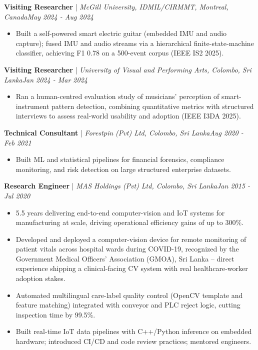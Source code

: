 \documentclass[11pt]{article}
\newenvironment{cvrole}[5]{%
  \par\noindent\textbf{\large #1} | \textit{\small #2, #3}\hfill \textit{\small #4 - #5}\par
  \begin{itemize}[leftmargin=2em, itemsep=-0.3em, topsep=-0.5em]%
}{%
  \end{itemize}\par\noindent\mbox{}\par\vspace{0.1em}%
}
\begin{document}
\begin{cvrole}{Visiting Researcher}{McGill University, IDMIL/CIRMMT}{Montreal, Canada}{May 2024}{Aug 2024}
\item Built a self-powered smart electric guitar (embedded IMU and audio capture); fused IMU and audio streams via a hierarchical finite-state-machine classifier, achieving F1 0.78 on a 500-event corpus (IEEE IS2 2025).
\end{cvrole}

\begin{cvrole}{Visiting Researcher}{University of Visual and Performing Arts}{Colombo, Sri Lanka}{Jan 2024}{Mar 2024}
\item Ran a human-centred evaluation study of musicians' perception of smart-instrument pattern detection, combining quantitative metrics with structured interviews to assess real-world usability and adoption (IEEE I3DA 2025).
\end{cvrole}

\begin{cvrole}{Technical Consultant}{Forestpin (Pvt) Ltd}{Colombo, Sri Lanka}{Aug 2020}{Feb 2021}
\item Built ML and statistical pipelines for financial forensics, compliance monitoring, and risk detection on large structured enterprise datasets.
\end{cvrole}

\begin{cvrole}{Research Engineer}{MAS Holdings (Pvt) Ltd}{Colombo, Sri Lanka}{Jan 2015}{Jul 2020}
\item 5.5 years delivering end-to-end computer-vision and IoT systems for manufacturing at scale, driving operational efficiency gains of up to 300\%.
\item Developed and deployed a computer-vision device for remote monitoring of patient vitals across hospital wards during COVID-19, recognized by the Government Medical Officers' Association (GMOA), Sri Lanka -- direct experience shipping a clinical-facing CV system with real healthcare-worker adoption stakes.
\item Automated multilingual care-label quality control (OpenCV template and feature matching) integrated with conveyor and PLC reject logic, cutting inspection time by 99.5\%.
\item Built real-time IoT data pipelines with C++/Python inference on embedded hardware; introduced CI/CD and code review practices; mentored engineers.
\end{cvrole}
\end{document}
